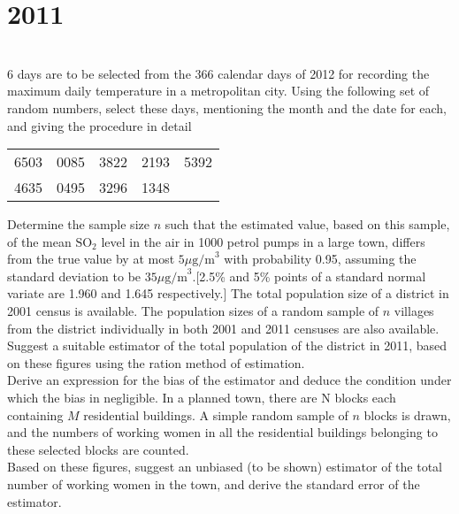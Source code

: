 \section*{2011}
\vspace{-.5cm}
\hrulefill \smallskip\\
 6 days are to be selected from the 366 calendar days of 2012 for recording the maximum daily temperature in a metropolitan city. Using the following set of random numbers, select these days, mentioning the month and the date for each, and giving the procedure in detail
\begin{table}[htbp]
    \centering
    \begin{tabular}{*{5}{c}}
        6503 & 0085 & 3822 & 2193 & 5392 \\
        4635 & 0495 & 3296 & 1348 & 
    \end{tabular}
\end{table}
 Determine the sample size $n$ such that the estimated value, based on this sample, of the mean $\text{SO}_2$ level in the air in 1000 petrol pumps in a large town, differs from the true value by at most $5\mu \text{g/m}^3$ with probability 0.95, assuming the standard deviation to be $35\mu\text{g/m}^3$.[2.5\% and 5\% points of a standard normal variate are 1.960 and 1.645 respectively.]
\myline
{} The total population size of a district in 2001 census is available. The population sizes of a random sample of $n$ villages from the district individually in both 2001 and 2011 censuses are also available. Suggest a suitable estimator of the total population of the district in 2011, based on these figures using the ration method of estimation. \smallskip \\
Derive an expression for the bias of the estimator and deduce the condition under which the bias in negligible.
\myline
{} In a planned town, there are N blocks each containing $M$ residential buildings. A simple random sample of $n$ blocks is drawn, and the numbers of working women in all the residential buildings belonging to these selected blocks are counted. \smallskip \\
Based on these figures, suggest an unbiased (to be shown) estimator of the total number of working women in the town, and derive the standard error of the estimator.